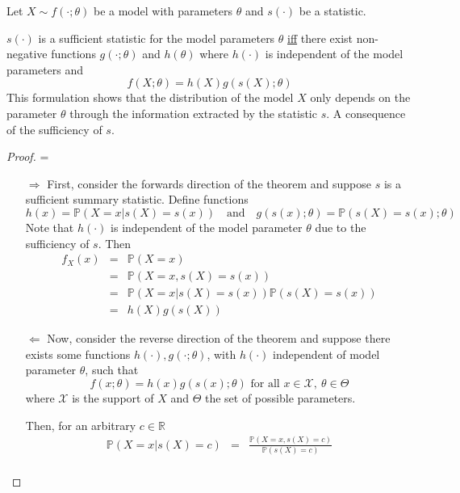\documentclass[11pt,a4paper]{article}
\newcommand*{\prob}{\mathbb{P}}
\theoremstyle{break}
\begin{document}
  \begin{box_theorem}\label{fisher_neyman_factorisation_criterion}
    \par\par Let $X\sim f(\cdot;\theta)$ be a model with parameters $\theta$ and $s(\cdot)$ be a statistic.
    \par $s(\cdot)$ is a sufficient statistic for the model parameters $\theta$ \underline{iff} there exist non-negative functions $g(\cdot;\theta)$ and $h(\theta)$ where $h(\cdot)$ is independent of the model parameters\footnotemark{} and
    \[ f(X;\theta)=h(X)g(s(X);\theta) \]
    This formulation shows that the distribution of the model $X$ only depends on the parameter $\theta$ through the information extracted by the statistic $s$. A consequence of the sufficiency of $s$.
    \begin{proof} \cite[]{fnf_theorem_proof}
      \everymath={\displaystyle}
      \begin{itemize}
        \item[$\Longrightarrow$] First, consider the forwards direction of the theorem and suppose $s$ is a sufficient summary statistic. Define functions
        \[ h(x)=\prob(X=x|s(X)=s(x))\quad\text{and}\quad g(s(x);\theta)=\prob(s(X)=s(x);\theta)\]
        Note that $h(\cdot)$ is independent of the model parameter $\theta$ due to the sufficiency of $s$. Then
        \[\begin{array}{rcl}
          f_X(x)&=&\prob(X=x)\\
          &=&\prob(X=x,s(X)=s(x))\\
          &=&\prob(X=x|s(X)=s(x))\prob(s(X)=s(x))\\
          &=&h(X)g(s(X))
        \end{array}\]
        \item[$\Longleftarrow$] Now, consider the reverse direction of the theorem and suppose there exists some functions $h(\cdot),g(\cdot;\theta)$, with $h(\cdot)$ independent of model parameter $\theta$, such that
        \[ f(x;\theta)=h(x)g(s(x);\theta)\text{ for all }x\in\mathcal{X},\ \theta\in\Theta \]
        where $\mathcal{X}$ is the support of $X$ and $\Theta$ the set of possible parameters.
        \par Then, for an arbitrary $c\in\mathbb{R}$
        \[\begin{array}{rcl}
          \prob(X=x|s(X)=c)&=&\frac{\prob(X=x,s(X)=c)}{\prob(s(X)=c)}\\

\end{array}\]
\end{itemize}
\end{proof}
\end{box_theorem}
\end{document}
